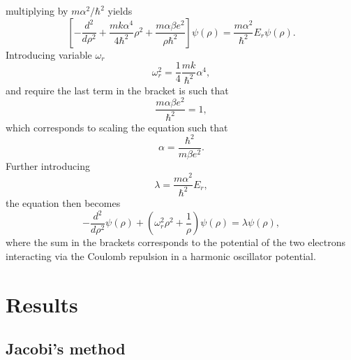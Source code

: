 \documentclass{emulateapj}
\begin{document}
%
multiplying by $m\alpha^2/\hbar^2$ yields
%
\begin{equation*}
    \left[-\frac{d^2}{d\rho^2} + \frac{mk\alpha^4}{4\hbar^2}\rho^2 + \frac{m\alpha\beta e^2}{\rho\hbar^2} \right]\psi(\rho) = \frac{m\alpha^2}{\hbar^2} E_r\psi(\rho).
\end{equation*}
%
Introducing variable $\omega_r$
%
\begin{equation*}
    \omega_r^2 = \frac{1}{4}\frac{mk}{\hbar^2}\alpha^4,
\end{equation*}
and require the last term in the bracket is such that
%
\begin{equation*}
    \frac{m\alpha \beta e^2}{\hbar^2} = 1,
\end{equation*}
%
which corresponds to scaling the equation such that
%
\begin{equation*}
     \alpha = \frac{\hbar^2}{m\beta e^2}.
\end{equation*}
%
Further introducing
%
\begin{equation*}
    \lambda = \frac{m\alpha^2}{\hbar^2}E_r,
\end{equation*}
%
the equation then becomes
%
\begin{equation*}
    -\frac{d^2}{d\rho^2}\psi(\rho) + \left(\omega_r^2\rho^2 + \frac{1}{\rho}\right)\psi(\rho) = \lambda \psi(\rho),
\end{equation*}
%
where the sum in the brackets corresponds to the potential of the two electrons interacting via the Coulomb repulsion in a harmonic oscillator potential.

\section{Results}
\label{sec:results}

\subsection{Jacobi's method}
\end{document}
